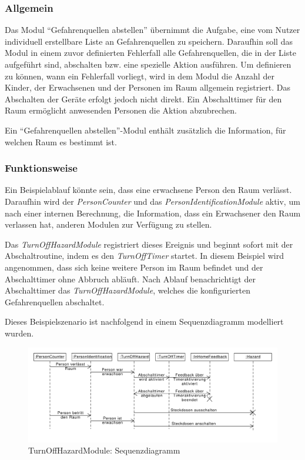 \subsubsection{Allgemein}
Das Modul "`Gefahrenquellen abstellen"' übernimmt die Aufgabe, eine vom Nutzer individuell erstellbare Liste an Gefahrenquellen zu speichern. Daraufhin soll das Modul in einem zuvor definierten Fehlerfall alle Gefahrenquellen, die in der Liste aufgeführt sind, abschalten bzw. eine spezielle Aktion ausführen. Um definieren zu können, wann ein Fehlerfall vorliegt, wird in dem Modul die Anzahl der Kinder, der Erwachsenen und der Personen im Raum allgemein registriert. Das Abschalten der Geräte erfolgt jedoch nicht direkt. Ein Abschalttimer für den Raum ermöglicht anwesenden Personen die Aktion abzubrechen.

Ein "`Gefahrenquellen abstellen"'-Modul enthält zusätzlich die Information, für welchen Raum es bestimmt ist.

\subsubsection{Funktionsweise}
Ein Beispielablauf könnte sein, dass eine erwachsene Person den Raum verlässt. Daraufhin wird der \textit{PersonCounter} und das \textit{PersonIdentificationModule} aktiv, um nach einer internen Berechnung, die Information, dass ein Erwachsener den Raum verlassen hat, anderen Modulen zur Verfügung zu stellen.

Das \textit{TurnOffHazardModule} registriert dieses Ereignis und beginnt sofort mit der Abschaltroutine, indem es den \textit{TurnOffTimer} startet. In diesem Beispiel wird angenommen, dass sich keine weitere Person im Raum befindet und der Abschalttimer ohne Abbruch abläuft. Nach Ablauf benachrichtigt der Abschalttimer das \textit{TurnOffHazardModule}, welches die konfigurierten Gefahrenquellen abschaltet.

Dieses Beispielszenario ist nachfolgend in einem Sequenzdiagramm modelliert wurden.

\begin{figure}[h!]
	\centering
	\includegraphics[width=\textwidth]{img/Modulkonzeption/TurnOffHazardSequence.pdf}
	\caption{TurnOffHazardModule: Sequenzdiagramm}
	\label{fig:turnOffHazard}
\end{figure}

